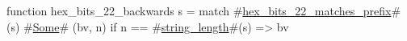 function hex_bits_22_backwards s =
  match #\hyperref[sailRISCVzhexzybitszy22zymatcheszyprefix]{hex\_bits\_22\_matches\_prefix}#(s) {
      #\hyperref[sailRISCVzSome]{Some}# (bv, n) if n == #\hyperref[sailRISCVzstringzylength]{string\_length}#(s) => bv
  }

